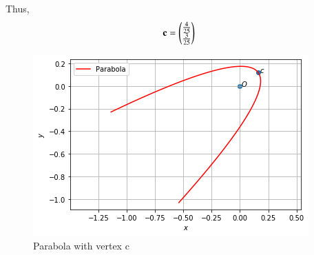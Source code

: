 Thus,
\begin{align}
    \vec{c} = \myvec{\frac{4}{25}\\\frac{3}{25}} %
\end{align}
\begin{figure}[h!]
    \centering
    \includegraphics[width=\columnwidth]{./solutions/41/5/A6.png}
    \caption{Parabola with vertex c}
    \label{eq:solutions/41/5/fig:fig1}
\end{figure}
